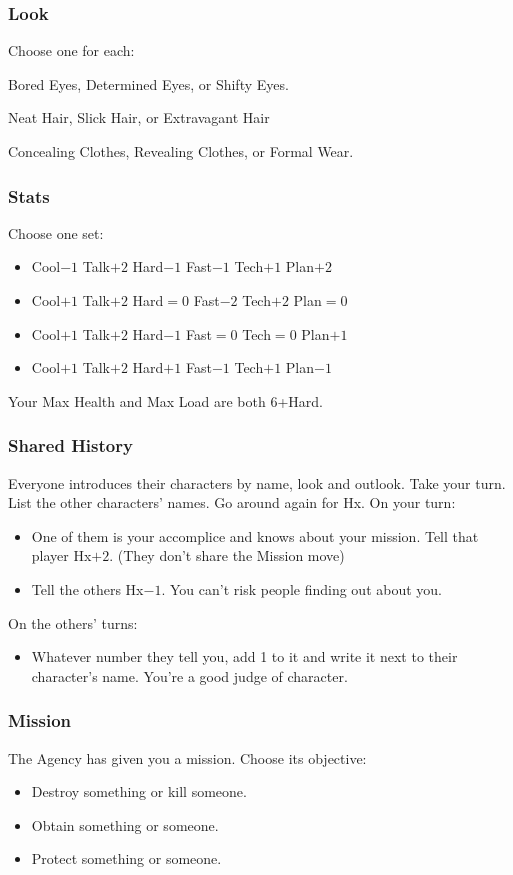 \subsubsection{Look}
Choose one for each:

Bored Eyes, Determined Eyes, or Shifty Eyes.

Neat Hair, Slick Hair, or Extravagant Hair

Concealing Clothes, Revealing Clothes, or Formal Wear.

\subsubsection{Stats}
Choose one set:
\begin{itemize}
\setlength\itemsep{0em}
\item Cool$-1$ Talk$+2$ Hard$-1$ Fast$-1$ Tech$+1$ Plan$+2$
\item Cool$+1$ Talk$+2$ Hard${=}0$ Fast$-2$ Tech$+2$ Plan${=}0$
\item Cool$+1$ Talk$+2$ Hard$-1$ Fast${=}0$ Tech${=}0$ Plan$+1$
\item Cool$+1$ Talk$+2$ Hard$+1$ Fast$-1$ Tech$+1$ Plan$-1$
\end{itemize}

Your Max Health and Max Load are both 6+Hard.

\subsubsection{Shared History}
Everyone introduces their characters by name, look and outlook. Take
your turn. List the other characters' names. Go around again for
Hx. On your turn:
\begin{itemize} %
\item One of them is your accomplice and knows about your
  mission. Tell that player Hx$+2$. (They don't share the Mission move)
\item Tell the others Hx$-1$. You can't risk people finding out about you.
\end{itemize}
On the others’ turns:
\begin{itemize} %
\item Whatever number they tell you, add 1 to it and write it next to their
  character’s name. You're a good judge of character.
\end{itemize}

\subsubsection{Mission}
The Agency has given you a mission. Choose its objective:
\begin{itemize}
\item Destroy something or kill someone.
\item Obtain something or someone.
\item Protect something or someone.
\end{itemize}

